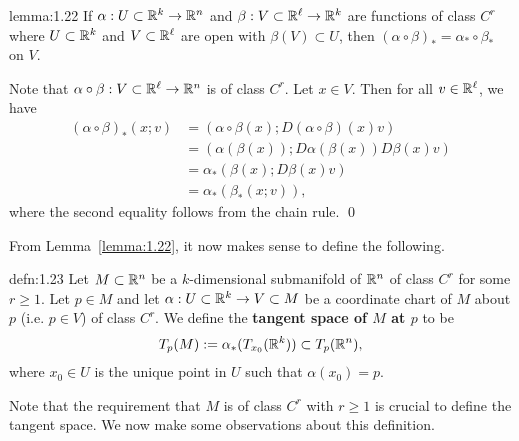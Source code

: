 \begin{lemma}{lemma:1.22}
    If $\alpha : U \subset \mathbb{R}^k \to \mathbb{R}^n$ and $\beta : V \subset \mathbb{R}^\ell 
    \to \mathbb{R}^k$ are functions of class $C^r$ where $U \subset \mathbb{R}^k$ and $V 
    \subset \mathbb{R}^\ell$ are open with $\beta(V) \subset U$, then 
    $(\alpha \circ \beta)_* = \alpha_* \circ \beta_*$ on $V$. 
\end{lemma}\vspace{-0.25cm} 
\begin{pf}
    Note that $\alpha \circ \beta : V \subset \mathbb{R}^\ell \to \mathbb{R}^n$ is 
    of class $C^r$. Let $x \in V$. Then for all $v \in \mathbb{R}^\ell$, we have 
    \begin{align*}
        (\alpha \circ \beta)_*(x; v) 
        &= (\alpha \circ \beta(x); D(\alpha \circ \beta)(x)v) \\ 
        &= (\alpha(\beta(x)); D\alpha(\beta(x))D\beta(x)v) \\ 
        &= \alpha_*(\beta(x); D\beta(x)v) \\ 
        &= \alpha_*(\beta_*(x; v)), 
    \end{align*} 
    where the second equality follows from the chain rule. \qed 
\end{pf}\vspace{-0.25cm}

From Lemma~\ref{lemma:1.22}, it now makes sense to define the following. 

\begin{defn}{defn:1.23}
    Let $M \subset \mathbb{R}^n$ be a $k$-dimensional submanifold of $\mathbb{R}^n$ 
    of class $C^r$ for some $r \geq 1$. Let $p \in M$ and let $\alpha : 
    U \subset \mathbb{R}^k \to V \subset M$ be a coordinate chart of $M$ 
    about $p$ (i.e. $p \in V$) of class $C^r$. We define the 
    {\bf tangent space of $M$ at $p$} to be 
    \[ T_p(M) := \alpha_*(T_{x_0}(\mathbb{R}^k)) \subset T_p(\mathbb{R}^n), \] 
    where $x_0 \in U$ is the unique point in $U$ such that $\alpha(x_0) = p$.  
\end{defn}\vspace{-0.25cm}

Note that the requirement that $M$ is of class $C^r$ with $r \geq 1$ 
is crucial to define the tangent space. We now make some observations 
about this definition. 

